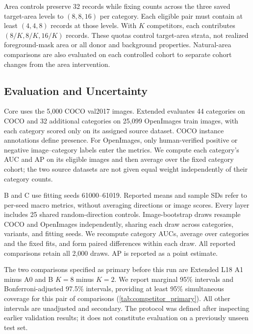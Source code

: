 Area controls preserve 32 records while fixing counts across the three
saved target-area levels to \((8,8,16)\) per category. Each eligible
pair must contain at least \((4,4,8)\) records at those levels. With
\(K\) competitors, each contributes \((8/K,8/K,16/K)\) records.
These quotas control target-area strata, not realized foreground-mask
area or all donor and background properties. Natural-area comparisons
are also evaluated on each controlled cohort to separate cohort changes
from the area intervention.




\subsection{Evaluation and Uncertainty}

Core uses the 5,000 COCO val2017 images. Extended evaluates 44 categories
on COCO and 32 additional categories on 25,099 OpenImages train images,
with each category scored only on its assigned source dataset. COCO
instance annotations define presence. For OpenImages, only human-verified
positive or negative image--category labels enter the metrics. We compute
each category's AUC and AP on its eligible images and then average over
the fixed category cohort; the two source datasets are not given equal
weight independently of their category counts.

B and C use fitting seeds 61000--61019. Reported means and sample SDs
refer to per-seed macro metrics, without averaging directions or image
scores. Every layer includes 25 shared random-direction controls.
Image-bootstrap draws resample COCO and OpenImages independently, sharing
each draw across categories, variants, and fitting seeds. We recompute
category AUCs, average over categories and the fixed fits, and form paired
differences within each draw. All reported comparisons retain all 2,000
draws. AP is reported as a point estimate.

The two comparisons specified as primary before this run are Extended
L18 A1 minus A0 and B \(K=8\) minus \(K=2\). We report marginal
95\% intervals and Bonferroni-adjusted 97.5\% intervals, providing at
least 95\% simultaneous coverage for this pair of comparisons
(\cref{tab:competitor_primary}). All other intervals are unadjusted and
secondary. The protocol was defined after inspecting earlier validation
results; it does not constitute evaluation on a previously unseen test set.

